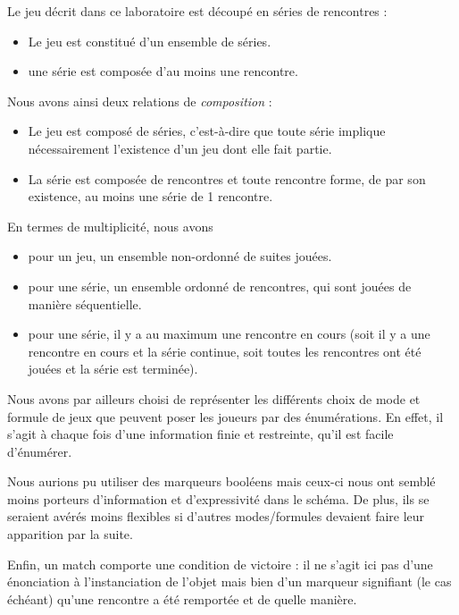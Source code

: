 \documentclass[oneside,a4paper]{book}
\begin{document}
Le jeu décrit dans ce laboratoire est découpé en séries de rencontres : 
\begin{itemize}
    \item Le jeu est constitué d'un ensemble de séries.
    \item une série est composée d'au moins une rencontre.
\end{itemize}

Nous avons ainsi deux relations de \textit{composition} : 
\begin{itemize}
    \item Le jeu est composé de séries, c'est-à-dire que toute série implique nécessairement l'existence d'un jeu dont elle fait partie.
    \item La série est composée de rencontres et toute rencontre forme, de par son existence, au moins une série de 1 rencontre.
\end{itemize}

En termes de multiplicité, nous avons
\begin{itemize}
    \item pour un jeu, un ensemble non-ordonné de suites jouées.
    \item pour une série, un ensemble ordonné de rencontres, qui sont jouées de manière séquentielle.
    \item pour une série, il y a au maximum une rencontre en cours (soit il y a une rencontre en cours et la série continue, soit toutes les rencontres ont été jouées et la série est terminée).
\end{itemize}

Nous avons par ailleurs choisi de représenter les différents choix de mode et formule de jeux que peuvent poser les joueurs par des énumérations. En effet, il s'agit à chaque fois d'une information finie et restreinte, qu'il est facile d'énumérer. 

\begin{tcolorbox}
    Nous aurions pu utiliser des marqueurs booléens mais ceux-ci nous ont semblé moins porteurs d'information et d'expressivité dans le schéma. De plus, ils se seraient avérés moins flexibles si d'autres modes/formules devaient faire leur apparition par la suite.
\end{tcolorbox}

Enfin, un match comporte une condition de victoire : il ne s'agit ici pas d'une énonciation à l'instanciation de l'objet mais bien d'un marqueur signifiant (le cas échéant) qu'une rencontre a été remportée et de quelle manière.
\end{document}
